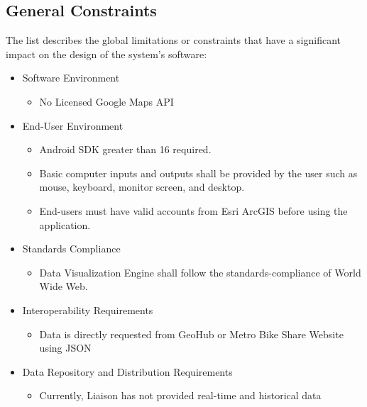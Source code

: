 \documentclass[a4paper,12pt]{article}
\begin{document}
    \subsection{General Constraints}
        The list describes the global limitations or constraints that have a significant impact on the design of the system’s software:
            \begin{itemize} 
                \item Software Environment
                \begin{itemize}
                    \item No Licensed Google Maps API 
                \end{itemize}
                \item End-User Environment
                    \begin{itemize}
                        \item Android SDK greater than 16 required.
                         \item Basic computer inputs and outputs shall be provided by the user such as mouse, keyboard, monitor screen, and desktop.
                         \item End-users must have valid accounts from Esri ArcGIS before using the application.
                    \end{itemize}
                \item Standards Compliance
                    \begin{itemize}
                        \item Data Visualization Engine shall follow the standards-compliance of World Wide Web.
                    \end{itemize}
                \item Interoperability Requirements
                    \begin{itemize}
                        \item Data is directly requested from GeoHub or Metro Bike Share Website using JSON
                    \end{itemize}
                \item Data Repository and Distribution Requirements
                    \begin{itemize}
                        \item Currently, Liaison has not provided real-time and historical data \end{itemize}
            \end{itemize}
\end{document}
